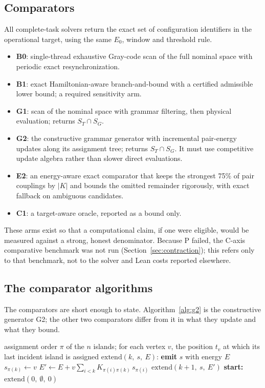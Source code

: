 \documentclass[11pt,a4paper]{article}
\theoremstyle{plain}
\theoremstyle{definition}
\theoremstyle{remark}
\newcommand{\SG}{S_{G}}
\newcommand{\ST}{S_{T}}
\newcommand{\Eo}{E_{0}}
\begin{document}
\subsection{Comparators}
All complete-task solvers return the exact set of configuration identifiers in the operational target, using the same $\Eo$, window and threshold rule.
\begin{itemize}
\item \textbf{B0}: single-thread exhaustive Gray-code scan of the full nominal space with periodic exact resynchronization.
\item \textbf{B1}: exact Hamiltonian-aware branch-and-bound with a certified admissible lower bound; a required sensitivity arm.
\item \textbf{G1}: scan of the nominal space with grammar filtering, then physical evaluation; returns $\ST\cap\SG$.
\item \textbf{G2}: the constructive grammar generator with incremental pair-energy updates along its assignment tree; returns $\ST\cap\SG$. It must use competitive update algebra rather than slower direct evaluations.
\item \textbf{E2}: an energy-aware exact comparator that keeps the strongest 75\% of pair couplings by $|K|$ and bounds the omitted remainder rigorously, with exact fallback on ambiguous candidates.
\item \textbf{C1}: a target-aware oracle, reported as a bound only.
\end{itemize}
These arms exist so that a computational claim, if one were eligible, would be measured against a strong, honest denominator. Because P failed, the C-axis comparative benchmark was not run (Section~\ref{sec:contraction}); this refers only to that benchmark, not to the solver and Lean costs reported elsewhere.

\subsection{The comparator algorithms}
The comparators are short enough to state. Algorithm~\ref{alg:g2} is the constructive generator G2; the other two comparators differ from it in what they update and what they bound.

\begin{algorithm}[t]
\caption{G2: target-blind constructive generation with incremental pair-energy updates (schematic).}
\label{alg:g2}
\begin{algorithmic}[1]
\Require assignment order $\pi$ of the $n$ islands; for each vertex $v$, the position $t_v$ at which its last incident island is assigned
\State $\mathrm{extend}(k,\ s,\ E)$:
 \State \textbf{emit} $s$ with energy $E$ \Return \EndIf
{}
  \State $s_{\pi(k)}\gets v$
  \State $E'\gets E+v\sum_{i<k}K_{\pi(i)\pi(k)}\,s_{\pi(i)}$ 
     \State $\mathrm{extend}(k+1,\ s,\ E')$
  \EndIf
\EndFor
\State \textbf{start:} $\mathrm{extend}(0,\ \emptyset,\ 0)$
\end{algorithmic}
\end{algorithm}
\end{document}
